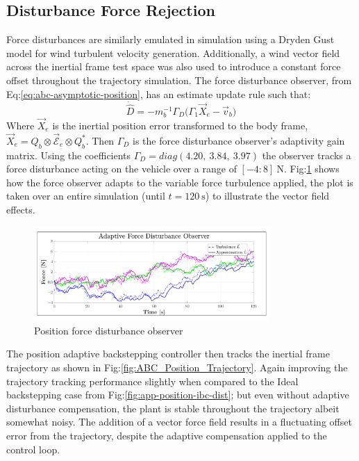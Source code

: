 \subsection{Disturbance Force Rejection}
\label{subsec:simulation.disturbance.force}
Force disturbances are similarly emulated in simulation using a Dryden Gust model for wind turbulent velocity generation. Additionally, a wind vector field across the inertial frame test space was also used to introduce a constant force offset throughout the trajectory simulation. The force disturbance observer, from Eq:\ref{eq:abc-asymptotic-position}, has an estimate update rule such that:
\begin{equation}
\dot{\hat{D}}=-m_b^{-1}\Gamma_D\Big(\Gamma_1\vec{X}_e-\vec{v}_b\Big)
\end{equation}
Where $\vec{X}_e$ is the inertial position error transformed to the body frame, $\vec{X}_e=Q_b\otimes\vec{\mathcal{E}}_e\otimes Q_b^*$. Then $\Gamma_D$ is the force disturbance observer's adaptivity gain matrix. Using the coefficients $\Gamma_D=diag(4.20,~3.84,~3.97)$ the observer tracks a force disturbance acting on the vehicle over a range of $[-4:8]~\text{N}$. Fig:\ref{fig:force-observer} shows how the force observer adapts to the variable force turbulence applied, the plot is taken over an entire simulation (until $t=120~\text{s}$) to illustrate the vector field effects.
\begin{figure}[hbtp]
\vspace{-6pt}
\centering
\includegraphics[width=0.8\textwidth]{graphs/force-observer}
\vspace{-12pt}
\caption{Position force disturbance observer}
\label{fig:force-observer}
\vspace{-16pt}
\end{figure}
\par
The position adaptive backstepping controller then tracks the inertial frame trajectory as shown in Fig:\ref{fig:ABC_Position_Trajectory}. Again improving the trajectory tracking performance slightly when compared to the Ideal backstepping case from Fig:\ref{fig:app-position-ibc-dist}; but even without adaptive disturbance compensation, the plant is stable throughout the trajectory albeit somewhat noisy. The addition of a vector force field results in a fluctuating offset error from the trajectory, despite the adaptive compensation applied to the control loop.
